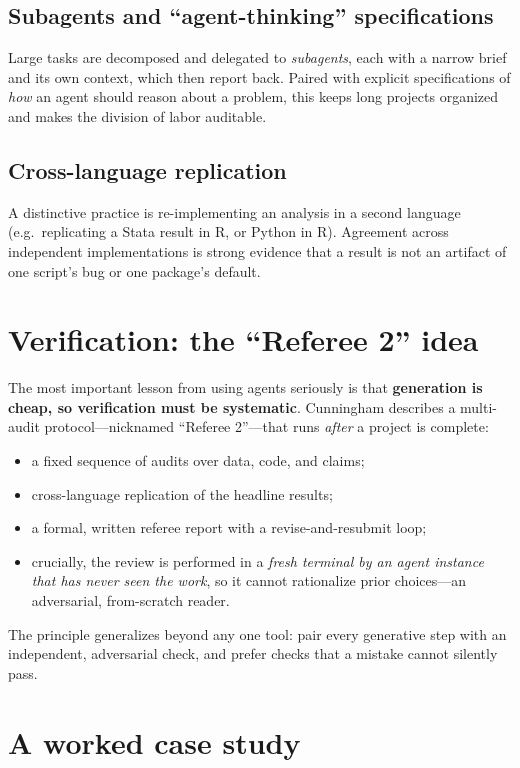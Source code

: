 \documentclass[11pt]{article}
\begin{document}
\subsection{Subagents and ``agent-thinking'' specifications}
Large tasks are decomposed and delegated to \emph{subagents}, each with a
narrow brief and its own context, which then report back. Paired with explicit
specifications of \emph{how} an agent should reason about a problem, this keeps
long projects organized and makes the division of labor auditable.

\subsection{Cross-language replication}
A distinctive practice is re-implementing an analysis in a second language
(e.g.\ replicating a Stata result in R, or Python in R). Agreement across
independent implementations is strong evidence that a result is not an artifact
of one script's bug or one package's default.

\section{Verification: the ``Referee 2'' idea}
\label{sec:verify}

The most important lesson from using agents seriously is that
\textbf{generation is cheap, so verification must be systematic}. Cunningham
describes a multi-audit protocol---nicknamed ``Referee 2''---that runs
\emph{after} a project is complete:

\begin{itemize}
  \item a fixed sequence of audits over data, code, and claims;
  \item cross-language replication of the headline results;
  \item a formal, written referee report with a revise-and-resubmit loop;
  \item crucially, the review is performed in a \emph{fresh terminal by an
    agent instance that has never seen the work}, so it cannot rationalize
    prior choices---an adversarial, from-scratch reader.
\end{itemize}

\noindent The principle generalizes beyond any one tool: pair every generative
step with an independent, adversarial check, and prefer checks that a mistake
cannot silently pass.

\section{A worked case study}
\end{document}
